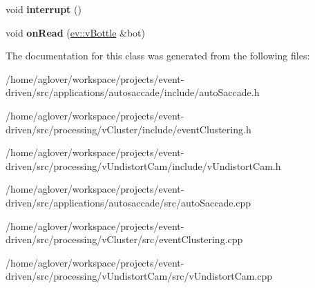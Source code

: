 \begin{DoxyCompactItemize}
\item 
void {\bfseries interrupt} ()\hypertarget{classEventBottleManager_a15152f9daa40714334c2da3871f959a9}{}\label{classEventBottleManager_a15152f9daa40714334c2da3871f959a9}

\item 
void {\bfseries on\+Read} (\hyperlink{classev_1_1vBottle}{ev\+::v\+Bottle} \&bot)\hypertarget{classEventBottleManager_aa848144d06e1970fb3c0482da838f078}{}\label{classEventBottleManager_aa848144d06e1970fb3c0482da838f078}

\end{DoxyCompactItemize}


The documentation for this class was generated from the following files\+:\begin{DoxyCompactItemize}
\item 
/home/aglover/workspace/projects/event-\/driven/src/applications/autosaccade/include/auto\+Saccade.\+h\item 
/home/aglover/workspace/projects/event-\/driven/src/processing/v\+Cluster/include/event\+Clustering.\+h\item 
/home/aglover/workspace/projects/event-\/driven/src/processing/v\+Undistort\+Cam/include/v\+Undistort\+Cam.\+h\item 
/home/aglover/workspace/projects/event-\/driven/src/applications/autosaccade/src/auto\+Saccade.\+cpp\item 
/home/aglover/workspace/projects/event-\/driven/src/processing/v\+Cluster/src/event\+Clustering.\+cpp\item 
/home/aglover/workspace/projects/event-\/driven/src/processing/v\+Undistort\+Cam/src/v\+Undistort\+Cam.\+cpp\end{DoxyCompactItemize}
